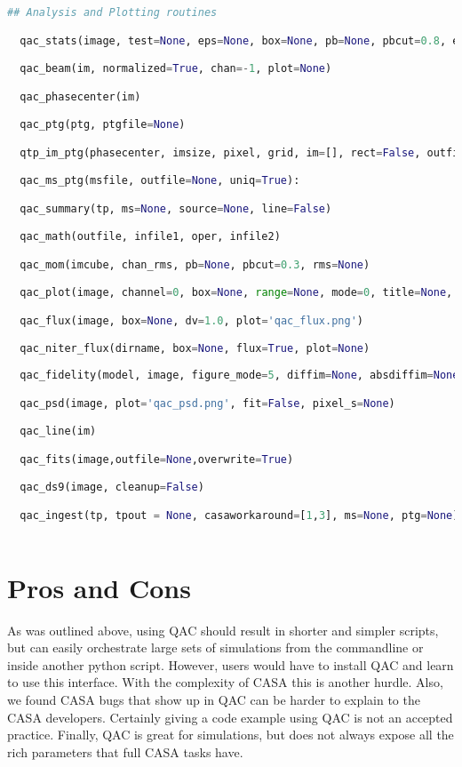 \documentclass[12pt,a4paper]{article}
\begin{document}
\begin{lstlisting}[language=python]
## Analysis and Plotting routines

  qac_stats(image, test=None, eps=None, box=None, pb=None, pbcut=0.8, edge=False)

  qac_beam(im, normalized=True, chan=-1, plot=None)

  qac_phasecenter(im)

  qac_ptg(ptg, ptgfile=None)

  qtp_im_ptg(phasecenter, imsize, pixel, grid, im=[], rect=False, outfile=None)

  qac_ms_ptg(msfile, outfile=None, uniq=True):  

  qac_summary(tp, ms=None, source=None, line=False)

  qac_math(outfile, infile1, oper, infile2)

  qac_mom(imcube, chan_rms, pb=None, pbcut=0.3, rms=None)

  qac_plot(image, channel=0, box=None, range=None, mode=0, title=None, plot=None)

  qac_flux(image, box=None, dv=1.0, plot='qac_flux.png')

  qac_niter_flux(dirname, box=None, flux=True, plot=None)
  
  qac_fidelity(model, image, figure_mode=5, diffim=None, absdiffim=None, fidelityim=None, absmodelim=None, interactive=False)

  qac_psd(image, plot='qac_psd.png', fit=False, pixel_s=None)

  qac_line(im)

  qac_fits(image,outfile=None,overwrite=True)

  qac_ds9(image, cleanup=False)

  qac_ingest(tp, tpout = None, casaworkaround=[1,3], ms=None, ptg=None)
  
\end{lstlisting}


\section{Pros and Cons}

As was outlined above, using QAC should result in shorter and simpler scripts,
but can easily orchestrate large sets of simulations
from the commandline or inside another python script.
However, users would have to install QAC and learn to use this interface.  With the complexity
of CASA this is another hurdle. Also, we found CASA bugs that show up in QAC can be harder to
explain to the CASA developers. Certainly giving a code example using QAC is not an accepted
practice. Finally, QAC is great for simulations, but does not always expose all the rich parameters
that full CASA tasks have. 
\end{document}
